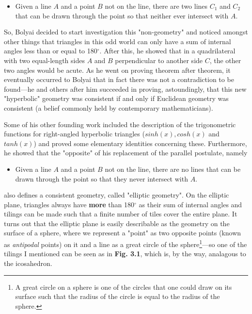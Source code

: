 \begin{multicols}{2}
\begin{itemize}
\item Given a line \(A\) and a point \(B\) not on the line, there are two lines \(C_1\) and \(C_2\) that can be drawn through the point so that neither ever intersect with \(A\).
\end{itemize}

So, Bolyai decided to start investigation this "non-geometry" and noticed amongst other things that triangles in this odd world can only have a sum of internal angles less than or equal to 180\(^\circ\). After this, he showed that in a quadrilateral with two equal-length sides \(A\) and \(B\) perpendicular to another side \(C\), the other two angles would be acute. As he went on proving theorem after theorem, it eventually occurred to Bolyai that in fact there was not a contradiction to be found---he and others after him succeeded in proving, astoundingly, that this new "hyperbolic" geometry was consistent if and only if Euclidean geometry was consistent (a belief commonly held by contemporary mathematicians).

Some of his other founding work included the description of the trigonometric functions for right-angled hyperbolic triangles (\(sinh(x), cosh(x)\) and \(tanh(x)\)) and proved some elementary identities concerning these. Furthermore, he showed that the "opposite" of his replacement of the parallel postulate, namely

\begin{itemize}
\item Given a line \(A\) and a point \(B\) not on the line, there are no lines that can be drawn through the point so that they never intersect with \(A\).
\end{itemize}

also defines a consistent geometry, called "elliptic geometry". On the elliptic plane, triangles always have \textbf{more} than 180\(^\circ\) as their sum of internal angles and tilings can be made such that a finite number of tiles cover the entire plane. It turns out that the elliptic plane is easily describable as the geometry on the surface of a sphere, where we represent a "point" as two opposite points (known as \textit{antipodal} points) on it and a line as a great circle of the sphere\footnote{A great circle on a sphere is one of the circles that one could draw on its surface such that the radius of the circle is equal to the radius of the sphere.}---so one of the tilings I mentioned can be seen as in \textbf{Fig. 3.1}, which is, by the way, analagous to the icosahedron.


\end{multicols}

